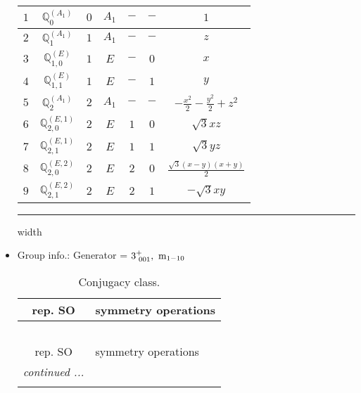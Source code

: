 \documentclass[fleqn,10pt,landscape]{article}
\begin{document}
\begin{itemize}
\begin{center}
\begin{longtable}{ccccccc}
$ 1 $ & $ \mathbb{Q}_{0}^{(A_{1})} $ & $ 0 $ & $ A_{1} $ & $ - $ & $ - $ & $ 1 $ \\ \hline
$ 2 $ & $ \mathbb{Q}_{1}^{(A_{1})} $ & $ 1 $ & $ A_{1} $ & $ - $ & $ - $ & $ z $ \\
$ 3 $ & $ \mathbb{Q}_{1,0}^{(E)} $ & $ 1 $ & $ E $ & $ - $ & $ 0 $ & $ x $ \\
$ 4 $ & $ \mathbb{Q}_{1,1}^{(E)} $ & $ 1 $ & $ E $ & $ - $ & $ 1 $ & $ y $ \\ \hline
$ 5 $ & $ \mathbb{Q}_{2}^{(A_{1})} $ & $ 2 $ & $ A_{1} $ & $ - $ & $ - $ & $ - \frac{x^{2}}{2} - \frac{y^{2}}{2} + z^{2} $ \\
$ 6 $ & $ \mathbb{Q}_{2,0}^{(E,1)} $ & $ 2 $ & $ E $ & $ 1 $ & $ 0 $ & $ \sqrt{3} x z $ \\
$ 7 $ & $ \mathbb{Q}_{2,1}^{(E,1)} $ & $ 2 $ & $ E $ & $ 1 $ & $ 1 $ & $ \sqrt{3} y z $ \\
$ 8 $ & $ \mathbb{Q}_{2,0}^{(E,2)} $ & $ 2 $ & $ E $ & $ 2 $ & $ 0 $ & $ \frac{\sqrt{3} \left(x - y\right) \left(x + y\right)}{2} $ \\
$ 9 $ & $ \mathbb{Q}_{2,1}^{(E,2)} $ & $ 2 $ & $ E $ & $ 2 $ & $ 1 $ & $ - \sqrt{3} x y $ \\
\end{longtable}
\end{center}

 \hfil \hrule height 1mm width \textwidth \hfil

\item Group info.: Generator = $3^{+}_{\,\,001},\,\,{\rm m}_{1-10}$

\begin{center}
\renewcommand{\arraystretch}{1.3}
\begin{longtable}{c|l}
\caption{Conjugacy class.}
 \\
 \hline \hline
rep. SO & symmetry operations \\ \hline \endfirsthead

\multicolumn{1}{l}{\tablename\ \thetable{}} \\
 \hline \hline
rep. SO & symmetry operations \\ \hline \endhead

 \hline \hline
\multicolumn{1}{r}{\footnotesize\it continued ...} \\ \endfoot


\end{longtable}
\end{center}
\end{itemize}
\end{document}
